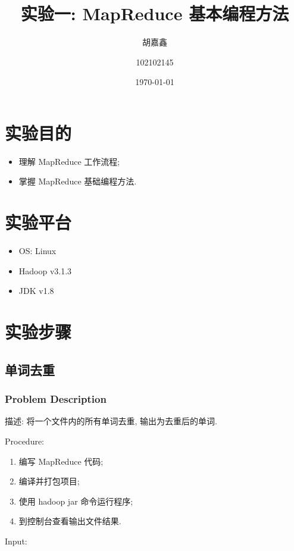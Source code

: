 \documentclass{article}
\title{实验一: MapReduce 基本编程方法}
\author{胡嘉鑫 \and 102102145}
\date{\today}
\begin{document}
    \maketitle
    \tableofcontents

    \section{实验目的}
    \begin{itemize}
      \item 理解 MapReduce 工作流程;
      \item 掌握 MapReduce 基础编程方法.
    \end{itemize}

    \section{实验平台}
    \begin{itemize}
      \item OS: Linux
      \item Hadoop v3.1.3
      \item JDK v1.8
    \end{itemize}

    \section{实验步骤}

    \subsection{单词去重}

    \subsubsection{Problem Description}

    描述: 将一个文件内的所有单词去重, 输出为去重后的单词.

    \noindent Procedure:
    \begin{enumerate}
      \item 编写 MapReduce 代码;
      \item 编译并打包项目;
      \item 使用 hadoop jar 命令运行程序;
      \item 到控制台查看输出文件结果.
    \end{enumerate}

    \noindent Input:
\end{document}
